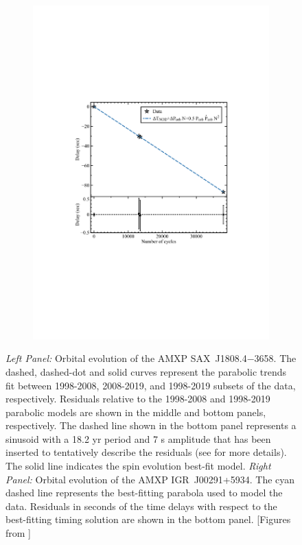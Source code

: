 \documentclass[graybox]{svmult}
\def \saxj{{\rm SAX~J1808.4$-$3658\xspace}}
\begin{document}
\begin{figure}
\begin{subfigure}{.5\textwidth}
  \includegraphics[width=1.45\linewidth]{REVIEW_AMXP/00291_orb_2}
  \label{fig:sfig2}
\end{subfigure}
\caption{\textit{Left Panel:} Orbital evolution of the AMXP \saxj{}. The dashed, dashed-dot and solid curves represent the parabolic trends fit between 1998-2008, 2008-2019, and 1998-2019 subsets of the data, respectively. Residuals relative to the 1998-2008 and 1998-2019 parabolic models are shown in the middle and bottom panels, respectively. The dashed line shown in the bottom panel represents a sinusoid with a 18.2 yr period and 7 s amplitude that has been inserted to tentatively describe the residuals (see \cite{Bult2019c} for more details). The solid line indicates the spin evolution best-fit model. \textit{Right Panel:} Orbital evolution of the AMXP IGR~J00291+5934. The cyan dashed line represents the best-fitting parabola used to model the data. Residuals in seconds of the time delays with respect to the best-fitting timing solution are shown in the bottom panel. [Figures from \cite{Bult2019c,Sanna2017d}]}
\label{fig:orb_evo}
\end{figure}
\end{document}
